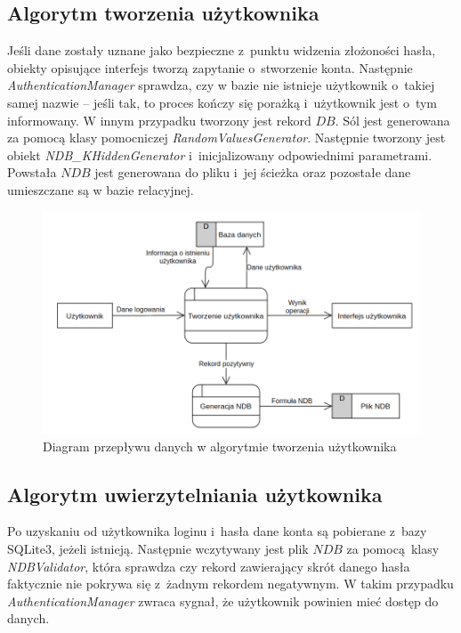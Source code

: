 \subsection{Algorytm tworzenia użytkownika}
Jeśli dane zostały uznane jako bezpieczne z~punktu widzenia złożoności hasła, obiekty opisujące interfejs tworzą zapytanie o~stworzenie konta. Następnie \textit{AuthenticationManager} sprawdza, czy w bazie nie istnieje użytkownik
o~takiej samej nazwie -- jeśli tak, to proces kończy się porażką i~użytkownik jest o~tym informowany. W innym przypadku tworzony jest rekord $DB$. Sól jest generowana za pomocą klasy pomocniczej \textit{RandomValuesGenerator}.
Następnie tworzony jest obiekt \textit{NDB\_KHiddenGenerator} i~inicjalizowany odpowiednimi parametrami. Powstała $NDB$ jest generowana do pliku i~jej ścieżka oraz pozostałe dane umieszczane są w bazie relacyjnej.
\begin{figure}[h]
    \includegraphics[width = 15.5cm]{img/diagrams/dfdregister.png}
    \centering
    \caption{Diagram przepływu danych w algorytmie tworzenia użytkownika}
    \label{img:dfd-register}
\end{figure}

\subsection{Algorytm uwierzytelniania użytkownika}
Po uzyskaniu od użytkownika loginu i~hasła dane konta są pobierane z~bazy SQLite3, jeżeli istnieją. Następnie wczytywany jest plik $NDB$ za pomocą klasy \textit{NDBValidator}, która sprawdza czy rekord zawierający skrót danego hasła
faktycznie nie pokrywa się z~żadnym rekordem negatywnym. W takim przypadku \textit{AuthenticationManager} zwraca sygnał, że użytkownik powinien mieć dostęp do danych.

